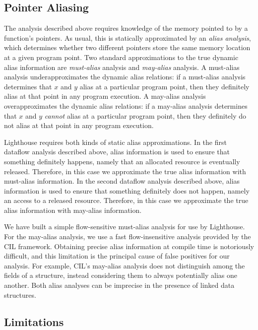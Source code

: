 \subsection{Pointer Aliasing}

The analysis described above requires knowledge of the memory
pointed to by a function's pointers.  As usual, this is
statically approximated by an {\em alias analysis}, which determines
whether two different pointers store the same memory location at a
given program point.  
 Two standard approximations to the true dynamic alias information 
are {\em must-alias} analysis and
{\em may-alias} analysis.  A must-alias analysis underapproximates the
dynamic alias relations:  if a must-alias analysis determines that $x$
and $y$ alias at a particular program point, then they
definitely alias at that point in 
any program execution.  A may-alias analysis overapproximates the dynamic
alias relations:  if a may-alias analysis determines that $x$ and $y$
{\em cannot} alias at a particular program point, then they
definitely do not alias at that point in any program execution.

Lighthouse requires both kinds of static alias approximations.  In
the first dataflow analysis described above, alias information is used to
ensure that something definitely happens, namely that an allocated
resource is eventually released.  Therefore, in this case we approximate
the true alias information with must-alias information.  In the second
dataflow analysis described above, alias information is used to ensure that
something definitely does not happen, namely an access to a released
resource.  Therefore, in this case we approximate the true alias
information with may-alias information.

We have built a simple flow-sensitive must-alias analysis for use by
Lighthouse.  
For the may-alias analysis, we use a fast flow-insensitive
analysis provided by the CIL framework.  
Obtaining precise
alias information at compile time is notoriously difficult, and this
limitation is the principal cause of false positives for our analysis.
For example, CIL's may-alias
analysis does not distinguish among the fields of a structure, instead
considering them to always potentially alias one another.  Both alias
analyses can be imprecise in the presence of linked data structures.


\subsection{Limitations}

